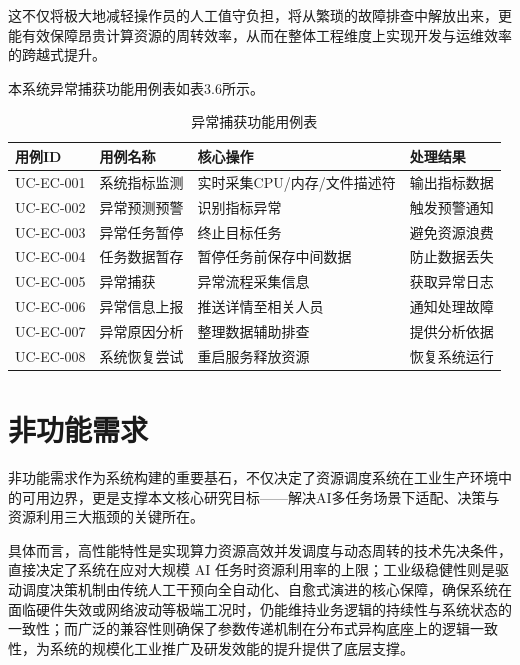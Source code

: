 这不仅将极大地减轻操作员的人工值守负担，将从繁琐的故障排查中解放出来，更能有效保障昂贵计算资源的周转效率，从而在整体工程维度上实现开发与运维效率的跨越式提升。

本系统异常捕获功能用例表如表3.6所示。

\begin{table}[htbp]
    \centering
    \caption{异常捕获功能用例表}
    \begin{tabular}{llll}
        \toprule
        \textbf{用例ID} & \textbf{用例名称} & \textbf{核心操作} & \textbf{处理结果} \\
        \midrule
        UC-EC-001 & 系统指标监测 & 实时采集CPU/内存/文件描述符 & 输出指标数据 \\
        UC-EC-002 & 异常预测预警 & 识别指标异常 & 触发预警通知 \\
        UC-EC-003 & 异常任务暂停 & 终止目标任务 & 避免资源浪费 \\
        UC-EC-004 & 任务数据暂存 & 暂停任务前保存中间数据 & 防止数据丢失 \\
        UC-EC-005 & 异常捕获 & 异常流程采集信息 & 获取异常日志 \\
        UC-EC-006 & 异常信息上报 & 推送详情至相关人员 & 通知处理故障 \\
        UC-EC-007 & 异常原因分析 & 整理数据辅助排查 & 提供分析依据 \\
        UC-EC-008 & 系统恢复尝试 & 重启服务释放资源 & 恢复系统运行 \\
        \bottomrule
    \end{tabular}
    \label{tab:exception_capture_cases}
\end{table}

\section{非功能需求}

非功能需求作为系统构建的重要基石，不仅决定了资源调度系统在工业生产环境中的可用边界，更是支撑本文核心研究目标——解决AI多任务场景下适配、决策与资源利用三大瓶颈的关键所在。

具体而言，高性能特性是实现算力资源高效并发调度与动态周转的技术先决条件，直接决定了系统在应对大规模 AI 任务时资源利用率的上限；工业级稳健性则是驱动调度决策机制由传统人工干预向全自动化、自愈式演进的核心保障，确保系统在面临硬件失效或网络波动等极端工况时，仍能维持业务逻辑的持续性与系统状态的一致性；而广泛的兼容性则确保了参数传递机制在分布式异构底座上的逻辑一致性，为系统的规模化工业推广及研发效能的提升提供了底层支撑。

